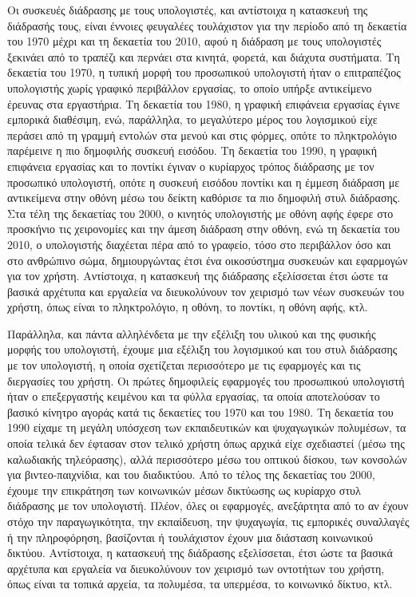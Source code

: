 \documentclass[
]{article}
\begin{document}
Οι συσκευές διάδρασης με τους υπολογιστές, και αντίστοιχα η κατασκευή
της διάδρασής τους, είναι έννοιες φευγαλέες τουλάχιστον για την περίοδο
από τη δεκαετία του 1970 μέχρι και τη δεκαετία του 2010, αφού η διάδραση
με τους υπολογιστές ξεκινάει από το τραπέζι και περνάει στα κινητά,
φορετά, και διάχυτα συστήματα. Tη δεκαετία του 1970, η τυπική μορφή του
προσωπικού υπολογιστή ήταν ο επιτραπέζιος υπολογιστής χωρίς γραφικό
περιβάλλον εργασίας, το οποίο υπήρξε αντικείμενο έρευνας στα εργαστήρια.
Τη δεκαετία του 1980, η γραφική επιφάνεια εργασίας έγινε εμπορικά
διαθέσιμη, ενώ, παράλληλα, το μεγαλύτερο μέρος του λογισμικού είχε
περάσει από τη γραμμή εντολών στα μενού και στις φόρμες, οπότε το
πληκτρολόγιο παρέμεινε η πιο δημοφιλής συσκευή εισόδου. Τη δεκαετία του
1990, η γραφική επιφάνεια εργασίας και το ποντίκι έγιναν ο κυρίαρχος
τρόπος διάδρασης με τον προσωπικό υπολογιστή, οπότε η συσκευή εισόδου
ποντίκι και η έμμεση διάδραση με αντικείμενα στην οθόνη μέσω του δείκτη
καθόρισε τα πιο δημοφιλή στυλ διάδρασης. Στα τέλη της δεκαετίας του
2000, ο κινητός υπολογιστής με οθόνη αφής έφερε στο προσκήνιο τις
χειρονομίες και την άμεση διάδραση στην οθόνη, ενώ τη δεκαετία του 2010,
ο υπολογιστής διαχέεται πέρα από το γραφείο, τόσο στο περιβάλλον όσο και
στο ανθρώπινο σώμα, δημιουργώντας έτσι ένα οικοσύστημα συσκευών και
εφαρμογών για τον χρήστη. Αντίστοιχα, η κατασκευή της διάδρασης
εξελίσσεται έτσι ώστε τα βασικά αρχέτυπα και εργαλεία να διευκολύνουν
τον χειρισμό των νέων συσκευών του χρήστη, όπως είναι το πληκτρολόγιο, η
οθόνη, το ποντίκι, η οθόνη αφής, κτλ.

Παράλληλα, και πάντα αλληλένδετα με την εξέλιξη του υλικού και της
φυσικής μορφής του υπολογιστή, έχουμε μια εξέλιξη του λογισμικού και του
στυλ διάδρασης με τον υπολογιστή, η οποία σχετίζεται περισσότερο με τις
εφαρμογές και τις διεργασίες του χρήστη. Οι πρώτες δημοφιλείς εφαρμογές
του προσωπικού υπολογιστή ήταν ο επεξεργαστής κειμένου και τα φύλλα
εργασίας, τα οποία αποτελούσαν το βασικό κίνητρο αγοράς κατά τις
δεκαετίες του 1970 και του 1980. Τη δεκαετία του 1990 είχαμε τη μεγάλη
υπόσχεση των εκπαιδευτικών και ψυχαγωγικών πολυμέσων, τα οποία τελικά
δεν έφτασαν στον τελικό χρήστη όπως αρχικά είχε σχεδιαστεί (μέσω της
καλωδιακής τηλεόρασης), αλλά περισσότερο μέσω του οπτικού δίσκου, των
κονσολών για βιντεο-παιχνίδια, και του διαδικτύου. Από το τέλος της
δεκαετίας του 2000, έχουμε την επικράτηση των κοινωνικών μέσων δικτύωσης
ως κυρίαρχο στυλ διάδρασης με τον υπολογιστή. Πλέον, όλες οι εφαρμογές,
ανεξάρτητα από το αν έχουν στόχο την παραγωγικότητα, την εκπαίδευση, την
ψυχαγωγία, τις εμπορικές συναλλαγές ή την πληροφόρηση, βασίζονται ή
τουλάχιστον έχουν μια διάσταση κοινωνικού δικτύου. Αντίστοιχα, η
κατασκευή της διάδρασης εξελίσσεται, έτσι ώστε τα βασικά αρχέτυπα και
εργαλεία να διευκολύνουν τον χειρισμό των οντοτήτων του χρήστη, όπως
είναι τα τοπικά αρχεία, τα πολυμέσα, τα υπερμέσα, το κοινωνικό δίκτυο,
κτλ.
\end{document}
